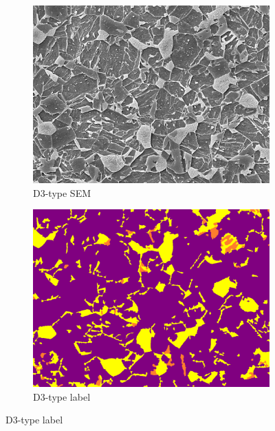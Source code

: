 \documentclass[]{article}
\begin{document}
\begin{figure}[ht]
\begin{subfigure}[b]{0.2\textwidth}
		\includegraphics[width=\textwidth]{images/D3-type/1.png}
		\caption{D3-type SEM}
		\label{fig:image2.4.1}
	\end{subfigure}
	\begin{subfigure}[b]{0.2\textwidth}
		\centering
		\includegraphics[width=\textwidth]{images/D3-type/1_label.png}
		\caption{D3-type label}
		\label{fig:image2.4.2}
	\end{subfigure}
	

\end{figure}
\end{document}
